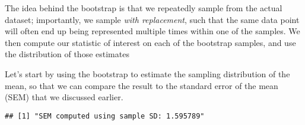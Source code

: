 \documentclass[]{book}
\newenvironment{Shaded}{\begin{snugshade}}{\end{snugshade}}
\newcommand{\KeywordTok}[1]{\textcolor[rgb]{0.13,0.29,0.53}{\textbf{#1}}}
\newcommand{\DataTypeTok}[1]{\textcolor[rgb]{0.13,0.29,0.53}{#1}}
\newcommand{\DecValTok}[1]{\textcolor[rgb]{0.00,0.00,0.81}{#1}}
\newcommand{\StringTok}[1]{\textcolor[rgb]{0.31,0.60,0.02}{#1}}
\newcommand{\CommentTok}[1]{\textcolor[rgb]{0.56,0.35,0.01}{\textit{#1}}}
\newcommand{\OtherTok}[1]{\textcolor[rgb]{0.56,0.35,0.01}{#1}}
\newcommand{\ControlFlowTok}[1]{\textcolor[rgb]{0.13,0.29,0.53}{\textbf{#1}}}
\newcommand{\OperatorTok}[1]{\textcolor[rgb]{0.81,0.36,0.00}{\textbf{#1}}}
\newcommand{\NormalTok}[1]{#1}
\theoremstyle{definition}
\theoremstyle{definition}
\theoremstyle{definition}
\theoremstyle{remark}
\begin{document}
The idea behind the bootstrap is that we repeatedly sample from the
actual dataset; importantly, we sample \emph{with replacement}, such
that the same data point will often end up being represented multiple
times within one of the samples. We then compute our statistic of
interest on each of the bootstrap samples, and use the distribution of
those estimates

Let's start by using the bootstrap to estimate the sampling distribution
of the mean, so that we can compare the result to the standard error of
the mean (SEM) that we discussed earlier.

\begin{Shaded}
\end{Shaded}

\begin{verbatim}
## [1] "SEM computed using sample SD: 1.595789"
\end{verbatim}

\begin{Shaded}
\end{Shaded}
\end{document}
